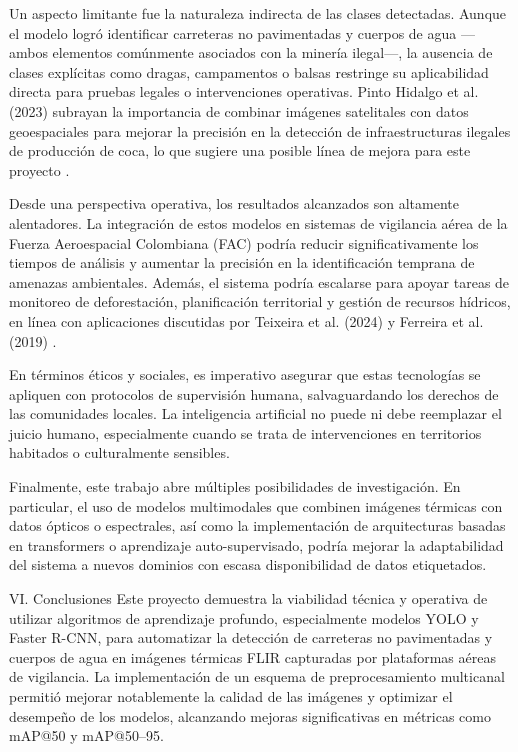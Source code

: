 Un aspecto limitante fue la naturaleza indirecta de las clases detectadas. Aunque el modelo logró identificar carreteras no pavimentadas y cuerpos de agua —ambos elementos comúnmente asociados con la minería ilegal—, la ausencia de clases explícitas como dragas, campamentos o balsas restringe su aplicabilidad directa para pruebas legales o intervenciones operativas. Pinto Hidalgo et al. (2023) subrayan la importancia de combinar imágenes satelitales con datos geoespaciales para mejorar la precisión en la detección de infraestructuras ilegales de producción de coca, lo que sugiere una posible línea de mejora para este proyecto
.

Desde una perspectiva operativa, los resultados alcanzados son altamente alentadores. La integración de estos modelos en sistemas de vigilancia aérea de la Fuerza Aeroespacial Colombiana (FAC) podría reducir significativamente los tiempos de análisis y aumentar la precisión en la identificación temprana de amenazas ambientales. Además, el sistema podría escalarse para apoyar tareas de monitoreo de deforestación, planificación territorial y gestión de recursos hídricos, en línea con aplicaciones discutidas por Teixeira et al. (2024) y Ferreira et al. (2019)
.

En términos éticos y sociales, es imperativo asegurar que estas tecnologías se apliquen con protocolos de supervisión humana, salvaguardando los derechos de las comunidades locales. La inteligencia artificial no puede ni debe reemplazar el juicio humano, especialmente cuando se trata de intervenciones en territorios habitados o culturalmente sensibles.

Finalmente, este trabajo abre múltiples posibilidades de investigación. En particular, el uso de modelos multimodales que combinen imágenes térmicas con datos ópticos o espectrales, así como la implementación de arquitecturas basadas en transformers o aprendizaje auto-supervisado, podría mejorar la adaptabilidad del sistema a nuevos dominios con escasa disponibilidad de datos etiquetados.

VI. Conclusiones
Este proyecto demuestra la viabilidad técnica y operativa de utilizar algoritmos de aprendizaje profundo, especialmente modelos YOLO y Faster R-CNN, para automatizar la detección de carreteras no pavimentadas y cuerpos de agua en imágenes térmicas FLIR capturadas por plataformas aéreas de vigilancia. La implementación de un esquema de preprocesamiento multicanal permitió mejorar notablemente la calidad de las imágenes y optimizar el desempeño de los modelos, alcanzando mejoras significativas en métricas como mAP@50 y mAP@50–95.

